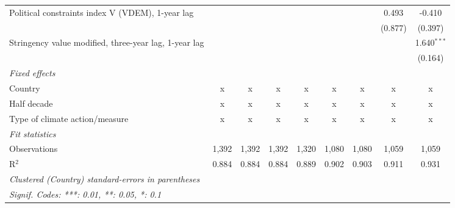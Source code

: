 \begin{table}[htbp]
\begin{tabular}{lcccccccc}
      Political constraints index V (VDEM), 1-year lag                                                     &              &              &              &              &              &               & 0.493         & -0.410\\   
                                                                                                           &              &              &              &              &              &               & (0.877)       & (0.397)\\   
      Stringency value modified, three-year lag, 1-year lag                                                &              &              &              &              &              &               &               & 1.640$^{***}$\\   
                                                                                                           &              &              &              &              &              &               &               & (0.164)\\   
      \emph{Fixed effects}\\
      Country                                                                                              & x            & x            & x            & x            & x            & x             & x             & x\\  
      Half decade                                                                                          & x            & x            & x            & x            & x            & x             & x             & x\\  
      Type of climate action/measure                                                                       & x            & x            & x            & x            & x            & x             & x             & x\\  
      \midrule \emph{Fit statistics}\\
      Observations                                                                                         & 1,392        & 1,392        & 1,392        & 1,320        & 1,080        & 1,080         & 1,059         & 1,059\\  
      R$^2$                                                                                                & 0.884        & 0.884        & 0.884        & 0.889        & 0.902        & 0.903         & 0.911         & 0.931\\  
      \midrule
      \multicolumn{9}{l}{\emph{Clustered (Country) standard-errors in parentheses}}\\
      \multicolumn{9}{l}{\emph{Signif. Codes: ***: 0.01, **: 0.05, *: 0.1}}\\
   \end{tabular}
\end{table}


